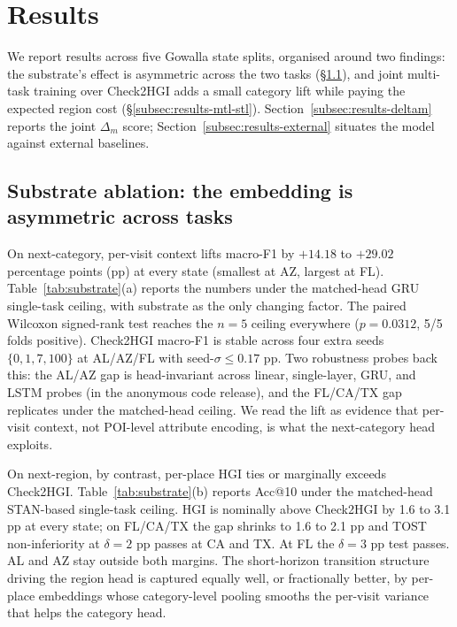 \section{Results}
\label{sec:results}

We report results across five Gowalla state splits, organised around two findings: the substrate's effect is asymmetric across the two tasks (\S\ref{subsec:results-substrate}), and joint multi-task training over Check2HGI adds a small category lift while paying the expected region cost (\S\ref{subsec:results-mtl-stl}). Section~\ref{subsec:results-deltam} reports the joint $\Delta_m$ score; Section~\ref{subsec:results-external} situates the model against external baselines.

\subsection{Substrate ablation: the embedding is asymmetric across tasks}
\label{subsec:results-substrate}

On next-category, per-visit context lifts macro-F1 by $+14.18$ to $+29.02$ percentage points (pp) at every state (smallest at AZ, largest at FL). Table~\ref{tab:substrate}(a) reports the numbers under the matched-head GRU single-task ceiling, with substrate as the only changing factor. The paired Wilcoxon signed-rank test reaches the $n=5$ ceiling everywhere ($p=0.0312$, 5/5 folds positive). Check2HGI macro-F1 is stable across four extra seeds $\{0, 1, 7, 100\}$ at AL/AZ/FL with seed-$\sigma\leq 0.17$ pp. Two robustness probes back this: the AL/AZ gap is head-invariant across linear, single-layer, GRU, and LSTM probes (in the anonymous code release), and the FL/CA/TX gap replicates under the matched-head ceiling. We read the lift as evidence that per-visit context, not POI-level attribute encoding, is what the next-category head exploits.

On next-region, by contrast, per-place HGI ties or marginally exceeds Check2HGI. Table~\ref{tab:substrate}(b) reports Acc@10 under the matched-head STAN-based single-task ceiling. HGI is nominally above Check2HGI by 1.6 to 3.1 pp at every state; on FL/CA/TX the gap shrinks to 1.6 to 2.1 pp and TOST non-inferiority at $\delta=2$ pp passes at CA and TX. At FL the $\delta=3$ pp test passes. AL and AZ stay outside both margins. The short-horizon transition structure driving the region head is captured equally well, or fractionally better, by per-place embeddings whose category-level pooling smooths the per-visit variance that helps the category head.

